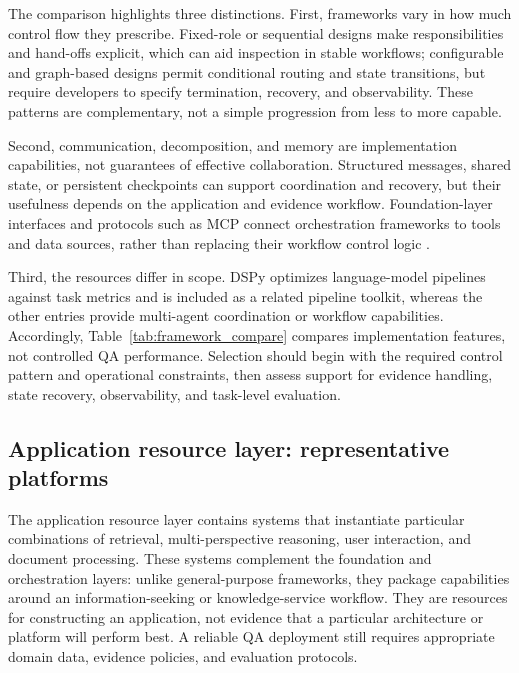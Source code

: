 \documentclass[a4paper,fleqn]{cas-dc}
\begin{document}
The comparison highlights three distinctions. First, frameworks vary in how
much control flow they prescribe. Fixed-role or sequential designs make
responsibilities and hand-offs explicit, which can aid inspection in stable
workflows; configurable and graph-based designs permit conditional routing and
state transitions, but require developers to specify termination, recovery,
and observability. These patterns are complementary, not a simple progression
from less to more capable.

Second, communication, decomposition, and memory are implementation
capabilities, not guarantees of effective collaboration. Structured messages,
shared state, or persistent checkpoints can support coordination and recovery,
but their usefulness depends on the application and evidence workflow.
Foundation-layer interfaces and protocols such as MCP connect orchestration
frameworks to tools and data sources, rather than replacing their workflow
control logic \citep{anthropic2024mcp}.

Third, the resources differ in scope. DSPy optimizes language-model pipelines
against task metrics and is included as a related pipeline toolkit, whereas the
other entries provide multi-agent coordination or workflow capabilities.
Accordingly, Table~\ref{tab:framework_compare} compares implementation
features, not controlled QA performance. Selection should begin with the
required control pattern and operational constraints, then assess support for
evidence handling, state recovery, observability, and task-level evaluation.


\subsection{Application resource layer: representative platforms}
\label{sec:application_resources}

The application resource layer contains systems that instantiate particular
combinations of retrieval, multi-perspective reasoning, user interaction, and
document processing. These systems
complement the foundation and orchestration layers: unlike general-purpose
frameworks, they package capabilities around an information-seeking or
knowledge-service workflow. They are resources for constructing an
application, not evidence that a particular architecture or platform will
perform best. A reliable QA deployment still requires appropriate domain
data, evidence policies, and evaluation protocols.
\end{document}
